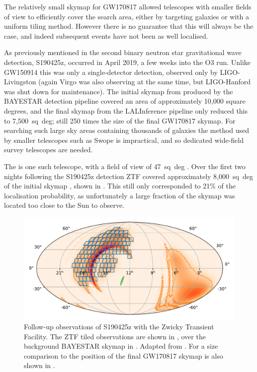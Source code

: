 \begin{colsection}
\begin{colsection}
The relatively small skymap for GW170817 allowed telescopes with smaller fields of view to efficiently cover the search area, either by targeting galaxies or with a uniform tiling method. However there is no guarantee that this will always be the case, and indeed subsequent events have not been as well localised.

As previously mentioned in  the second binary neutron star gravitational wave detection, S190425z, occurred in April 2019, a few weeks into the O3 run. Unlike GW150914 this was only a single-detector detection, observed only by LIGO-Livingston (again Virgo was also observing at the same time, but LIGO-Hanford was shut down for maintenance). The initial skymap from produced by the BAYESTAR detection pipeline \citep{BAYESTAR} covered an area of approximately 10,000 square degrees, and the final skymap from the LALInference pipeline \citep{LALInference} only reduced this to 7,500~sq~deg; still 250 times the size of the final GW170817 skymap. For searching such large sky areas containing thousands of galaxies the method used by smaller telescopes such as Swope is impractical, and so dedicated wide-field survey telescopes are needed.

The  is one such telescope, with a field of view of 47~sq~deg \citep{ZTF}. Over the first two nights following the S190425z detection ZTF covered approximately 8,000~sq~deg of the initial skymap \citep{GW190425_ZTF}, shown in . This still only corresponded to 21\% of the localisation probability, as unfortunately a large fraction of the skymap was located too close to the Sun to observe.

\newpage

\begin{figure}[t]
    \begin{center}
        \includegraphics[width=0.9\linewidth]{images/190425_ztf.pdf}
    \end{center}
    \caption[Follow-up observations of S190425z with ZTF]{
        Follow-up observations of S190425z with the Zwicky Transient Facility. The ZTF tiled observations are shown in , over the background BAYESTAR skymap in . Adapted from \citet{GW190425_ZTF}. For a size comparison to  the position of the final GW170817 skymap is also shown in .
        }\label{fig:ztf}
\end{figure}


\end{colsection}
\end{colsection}
